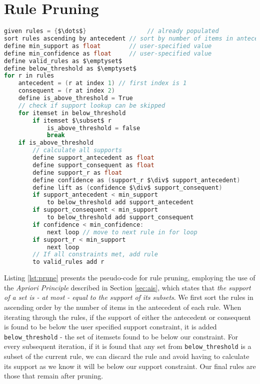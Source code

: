 \section{Rule Pruning}
\label{sec:prune}
\begin{lstlisting}[language=C, mathescape=true, caption=Rule Pruning, label=lst:prune]
given rules = {$\dots$}                 // already populated
sort rules ascending by antecedent // sort by number of items in antecedent
define min_support as float        // user-specified value
define min_confidence as float     // user-specified value
define valid_rules as $\emptyset$
define below_threshold as $\emptyset$
for r in rules
    antecedent = (r at index 1) // first index is 1
    consequent = (r at index 2)
    define is_above_threshold = True 
    // check if support lookup can be skipped
    for itemset in below_threshold
        if itemset $\subset$ r
            is_above_threshold = false
            break
    if is_above_threshold
        // calculate all supports
        define support_antecedent as float
        define support_consequent as float
        define support_r as float 
        define confidence as (support_r $\div$ support_antecedent)
        define lift as (confidence $\div$ support_consequent)
        if support_antecedent < min_support
            to below_threshold add support_antecedent
        if support_consequent < min_support
            to below_threshold add support_consequent
        if confidence < min_confidence:
            next loop // move to next rule in for loop
        if support_r < min_support
            next loop 
        // If all constraints met, add rule
        to valid_rules add r
\end{lstlisting}
Listing \ref{lst:prune} presents the pseudo-code for rule pruning, employing the use of the \textit{Apriori Principle} described in Section \ref{sec:ais}, which states that \textit{the support of a set is - at most - equal to the support of its subsets}. We first sort the rules in ascending order by the number of items in the antecedent of each rule. When iterating through the rules, if the support of either the antecedent or consequent is found to be below the user specified support constraint, it is added \texttt{below\_threshold} - the set of itemsets found to be below our constraint. For every subsequent iteration, if it is found that any set from \texttt{below\_threshold} is a subset of the current rule, we can discard the rule and avoid having to calculate its support as we know it will be below our support constraint. Our final rules are those that remain after pruning.


